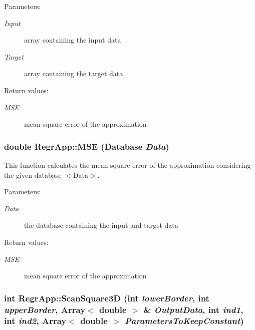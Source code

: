 \begin{Desc}
\item[Parameters:]
\begin{description}
\item[{\em Input}]array containing the input data \item[{\em Target}]array containing the target data \end{description}
\end{Desc}
\begin{Desc}
\item[Return values:]
\begin{description}
\item[{\em MSE}]mean square error of the approximation \end{description}
\end{Desc}
\subsubsection{\setlength{\rightskip}{0pt plus 5cm}double Regr\-App::MSE (Database {\em Data})}\label{classRegrApp_92022efb15d1c039dfc3e67ea804dbe4}


This function calculates the mean square error of the approximation considering the given database $<$Data$>$. 

\begin{Desc}
\item[Parameters:]
\begin{description}
\item[{\em Data}]the database containing the input and target data \end{description}
\end{Desc}
\begin{Desc}
\item[Return values:]
\begin{description}
\item[{\em MSE}]mean square error of the approximation \end{description}
\end{Desc}
\subsubsection{\setlength{\rightskip}{0pt plus 5cm}int Regr\-App::Scan\-Square3D (int {\em lower\-Border}, int {\em upper\-Border}, Array$<$ double $>$ \& {\em Output\-Data}, int {\em ind1}, int {\em ind2}, Array$<$ double $>$ {\em Parameters\-To\-Keep\-Constant})}\label{classRegrApp_0b2333d0504438f5a2f7f30be963c6ad}



